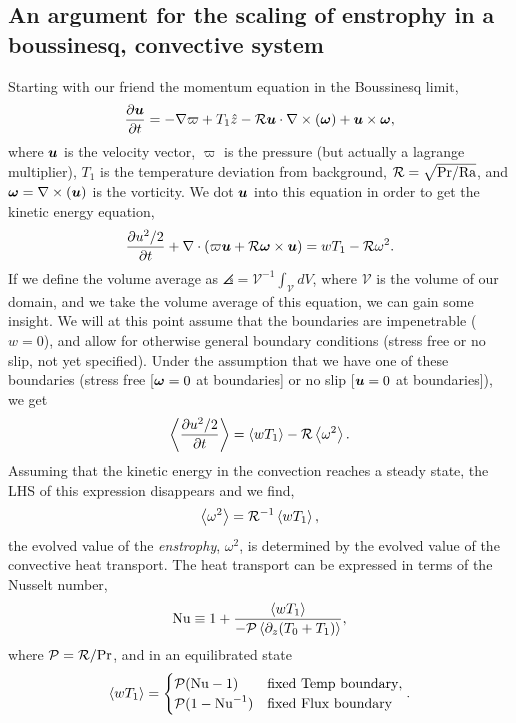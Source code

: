 \subsection{An argument for the scaling of enstrophy in a boussinesq, convective system}
\label{sec:enstrophy_scaling}
Starting with our friend the momentum equation in the Boussinesq limit,
\begin{equation}
\frac{\partial \bm{u}}{\partial t} = -\nabla\varpi + T_1\hat{z} - \mathcal{R} \bm{u} \cdot \nabla \times \left(\bm{\omega}\right) + \bm{u} \times \bm{\omega},
\label{eqn:momentum}
\end{equation}
where $\bm{u}$ is the velocity vector, $\varpi$ is the pressure (but actually a lagrange multiplier), $T_1$ is the temperature deviation from background, $\mathcal{R} = \sqrt{\text{Pr}/\text{Ra}}$, and $\bm{\omega} = \nabla \times \left(\bm{u}\right)$ is the vorticity.
We dot $\bm{u}$ into this equation in order to get the kinetic energy equation,
\begin{equation}
\frac{\partial u^2/2}{\partial t} + \nabla\cdot\left( \varpi \bm{u} + \mathcal{R} \bm{\omega} \times \bm{u}\right) = w T_1 - \mathcal{R} \omega^2.
\end{equation}
If we define the volume average as $\angles = \mathcal{V}^{-1}\int_{\mathcal{V}} dV$, where $\mathcal{V}$ is the volume of our domain, and we take the volume average of this equation, we can gain some insight.
We will at this point assume that the boundaries are impenetrable ($w = 0$), and allow for otherwise general boundary conditions (stress free or no slip, not yet specified).
Under the assumption that we have one of these boundaries (stress free [$\bm{\omega} = 0$ at boundaries] or no slip [$\bm{u} = 0$ at boundaries]), we get
\begin{equation}
\left\langle \frac{\partial u^2/2}{\partial t} \right\rangle = \left\langle w T_1 \right\rangle - \mathcal{R} \left\langle \omega^2 \right\rangle.
\end{equation}
Assuming that the kinetic energy in the convection reaches a steady state, the LHS of this expression disappears and we find,
\begin{equation}
\left\langle \omega^2 \right\rangle = \mathcal{R}^{-1} \left\langle w T_1 \right\rangle,
\end{equation}
the evolved value of the \emph{enstrophy}, $\omega^2$, is determined by the evolved value of the convective heat transport.
The heat transport can be expressed in terms of the Nusselt number, 
\begin{equation}
\text{Nu} \equiv 1 + \frac{\left\langle w T_1 \right\rangle}{-\mathcal{P} \left\langle \partial_z (T_0 + T_1) \right\rangle},
\end{equation}
where $\mathcal{P} = \mathcal{R}/\text{Pr}$, and in an equilibrated state
\begin{equation}
\left\langle w T_1 \right\rangle = 
\begin{cases}
\mathcal{P} (\text{Nu} - 1)  & \text{fixed Temp boundary}, \\
\mathcal{P} (1 - \text{Nu}^{-1}) & \text{fixed Flux boundary}
\end{cases}.
\end{equation}
